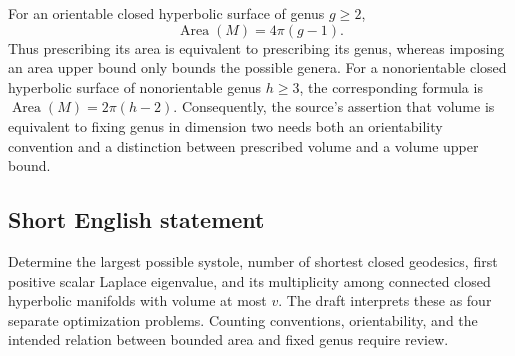 \documentclass[11pt]{article}
\begin{document}
For an orientable closed hyperbolic surface of genus \(g\geq2\),
\[
\operatorname{Area}(M)=4\pi(g-1).
\]
Thus prescribing its area is equivalent to prescribing its genus, whereas imposing an area upper bound only bounds the possible genera. For a nonorientable closed hyperbolic surface of nonorientable genus \(h\geq3\), the corresponding formula is \(\operatorname{Area}(M)=2\pi(h-2)\). Consequently, the source's assertion that volume is equivalent to fixing genus in dimension two needs both an orientability convention and a distinction between prescribed volume and a volume upper bound.
\subsection{Short English statement}
Determine the largest possible systole, number of shortest closed geodesics, first positive scalar Laplace eigenvalue, and its multiplicity among connected closed hyperbolic manifolds with volume at most \(v\). The draft interprets these as four separate optimization problems. Counting conventions, orientability, and the intended relation between bounded area and fixed genus require review.
\end{document}
